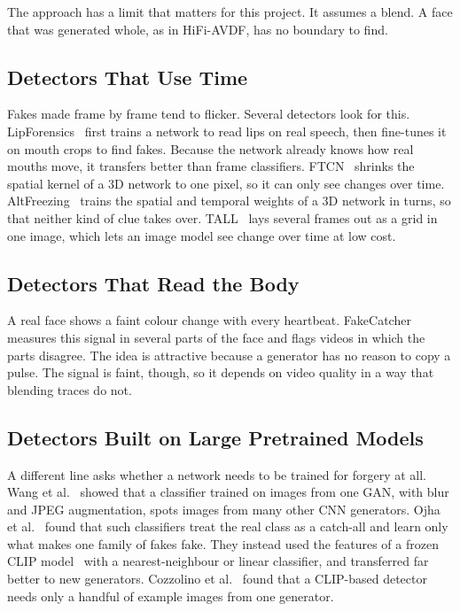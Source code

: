 The approach has a limit that matters for this project. It assumes a blend.
A face that was generated whole, as in HiFi-AVDF, has no boundary to find.

\subsection{Detectors That Use Time}

Fakes made frame by frame tend to flicker. Several detectors look for this.
LipForensics~\cite{lipforensics} first trains a network to read lips on real
speech, then fine-tunes it on mouth crops to find fakes. Because the network
already knows how real mouths move, it transfers better than frame
classifiers. FTCN~\cite{ftcn} shrinks the spatial kernel of a 3D network to
one pixel, so it can only see changes over time. AltFreezing~\cite{altfreezing}
trains the spatial and temporal weights of a 3D network in turns, so that
neither kind of clue takes over. TALL~\cite{tall} lays several frames out as
a grid in one image, which lets an image model see change over time at low
cost.

\subsection{Detectors That Read the Body}

A real face shows a faint colour change with every heartbeat. FakeCatcher~\cite{fakecatcher}
measures this signal in several parts of the face and flags videos in which
the parts disagree. The idea is attractive because a generator has no reason
to copy a pulse. The signal is faint, though, so it depends on video quality
in a way that blending traces do not.

\subsection{Detectors Built on Large Pretrained Models}

A different line asks whether a network needs to be trained for forgery at
all. Wang et al.~\cite{cnnspot} showed that a classifier trained on images
from one GAN, with blur and JPEG augmentation, spots images from many other
CNN generators. Ojha et al.~\cite{univfd} found that such classifiers treat
the real class as a catch-all and learn only what makes one family of fakes
fake. They instead used the features of a frozen CLIP model~\cite{clip} with a
nearest-neighbour or linear classifier, and transferred far better to new
generators. Cozzolino et al.~\cite{cozzolino2024} found that a CLIP-based
detector needs only a handful of example images from one generator.

